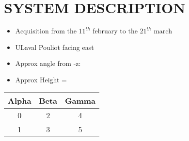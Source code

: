 \section{SYSTEM DESCRIPTION}

\begin{itemize}
    \item Acquisition from the $11^{th}$ february to the $21^{th}$ march
    \item ULaval Pouliot facing east
    \item Approx angle from -z:
    \item Approx Height =
\end{itemize}

\begin{table}[htbp]
    \centering
    \begin{tabularx}{\textwidth}{| c | c | c |}
        \hline
        Alpha     & Beta     & Gamma     \\ \hline
        0         & 2        & 4         \\ \hline
        1         & 3        & 5         \\ \hline
    \end{tabularx}
\end{table}
